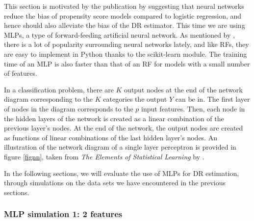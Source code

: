 \documentclass[12pt,twoside]{article}
\begin{document}
This section is motivated by the publication by \citet{setoguchi-nn} suggesting that neural networks reduce the bias of propensity score models compared to logistic regression, and hence should also alleviate the bias of the DR estimator. This time we are using MLPs, a type of forward-feeding artificial neural network. As mentioned by \citet{hastieESL}, there is a lot of popularity surrounding neural networks lately, and like RFs, they are easy to implement in Python thanks to the scikit-learn module. The training time of an MLP is also faster than that of an RF for models with a small number of features. 

In a classification problem, there are $K$ output nodes at the end of the network diagram corresponding to the $K$ categories the output $Y$ can be in. The first layer of nodes in the diagram corresponds to the $p$ input features. Then, each node in the hidden layers of the network is created as a linear combination of the previous layer's nodes. At the end of the network, the output nodes are created as functions of linear combinations of the last hidden layer's nodes. An illustration of the network diagram of a single layer perceptron is provided in figure \ref{fignn}, taken from \textit{The Elements of Statistical Learning} by \citet{hastieESL}.

In the following sections, we will evaluate the use of MLPs for DR estimation, through simulations on the data sets we have encountered in the previous sections.

\subsubsection{MLP simulation 1: 2 features} \label{MLP simu 1}
\end{document}

